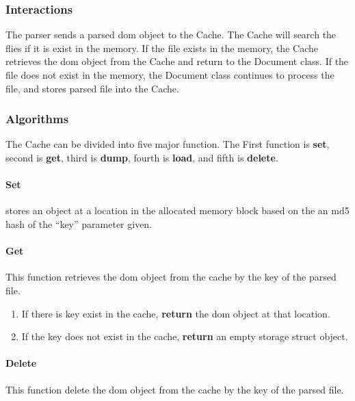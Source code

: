 \subsubsection{Interactions}

The parser sends a parsed \gls{dom} object to the Cache. 
The Cache will search the flies if it is exist in the memory. 
If the file exists in the memory, the Cache retrieves the \gls{dom} object from the Cache and return to the Document class. 
If the file does not exist in the memory, the Document class continues to process the file, and stores parsed file into the Cache.

\subsubsection{Algorithms}

The Cache can be divided into five major function.
The First function is \textbf{set}, second is \textbf{get}, third is \textbf{dump}, fourth is \textbf{load}, and fifth is \textbf{delete}.

\paragraph{Set} stores an object at a location in the allocated memory block based on the an \gls{md5} hash of the ``key'' parameter given.

\paragraph{Get} This function retrieves the \gls{dom} object from the cache by the key of the parsed file.

\begin{enumerate}
    \item If there is key exist in the cache, \textbf{return} the \gls{dom} object at that location.
    \item If the key does not exist in the cache, \textbf{return} an empty storage struct object.
\end{enumerate}

\paragraph{Delete} This function delete the \gls{dom} object from the cache by the key of the parsed file.

